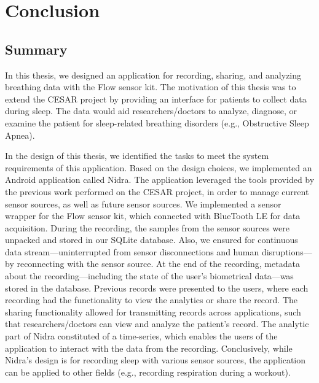 \chapter{Conclusion}

\section{Summary}
In this thesis, we designed an application for recording, sharing, and analyzing breathing data with the Flow sensor kit. The motivation of this thesis was to extend the CESAR project by providing an interface for patients to collect data during sleep. The data would aid researchers/doctors to analyze, diagnose, or examine the patient for sleep-related breathing disorders (e.g., Obstructive Sleep Apnea).  

In the design of this thesis, we identified the tasks to meet the system requirements of this application. Based on the design choices, we implemented an Android application called Nidra. The application leveraged the tools provided by the previous work performed on the CESAR project, in order to manage current sensor sources, as well as future sensor sources. We implemented a sensor wrapper for the Flow sensor kit, which connected with BlueTooth LE for data acquisition. During the recording, the samples from the sensor sources were unpacked and stored in our SQLite database. Also, we ensured for continuous data stream---uninterrupted from sensor disconnections and human disruptions---by reconnecting with the sensor source. At the end of the recording, metadata about the recording---including the state of the user's biometrical data---was stored in the database. Previous records were presented to the users, where each recording had the functionality to view the analytics or share the record. The sharing functionality allowed for transmitting records across applications, such that researchers/doctors can view and analyze the patient's record. The analytic part of Nidra constituted of a time-series, which enables the users of the application to interact with the data from the recording.  Conclusively, while Nidra's design is for recording sleep with various sensor sources, the application can be applied to other fields (e.g., recording respiration during a workout).  

